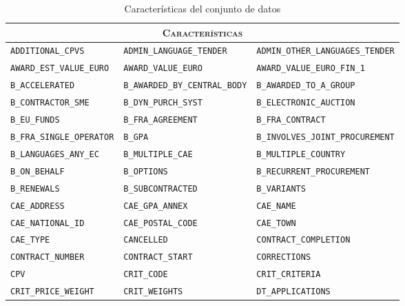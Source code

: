 \documentclass[a4paper,fleqn]{cas-sc}
\begin{document}
\begin{table}[t]
	\centering
	\scriptsize
	  \setlength{\tabcolsep}{7pt} 
	\renewcommand{\arraystretch}{1.3} %
	\caption{Características del conjunto de datos} \label{tab:variables} 	
	\begin{adjustbox}{max width=\textwidth}	
		\begin{tabular}{p{4cm}p{4.2cm}p{4.7cm}}		
			\hline
			\multicolumn{3}{c}{\textsc{\textbf{Características}}} \\ \hline
	
	\texttt{ADDITIONAL\_CPVS} & \texttt{ADMIN\_LANGUAGE\_TENDER} & \texttt{ADMIN\_OTHER\_LANGUAGES\_TENDER} \\
	\texttt{AWARD\_EST\_VALUE\_EURO} & \texttt{AWARD\_VALUE\_EURO} & \texttt{AWARD\_VALUE\_EURO\_FIN\_1} \\
	\texttt{B\_ACCELERATED} & \texttt{B\_AWARDED\_BY\_CENTRAL\_BODY} & \texttt{B\_AWARDED\_TO\_A\_GROUP} \\
	\texttt{B\_CONTRACTOR\_SME} & \texttt{B\_DYN\_PURCH\_SYST} & \texttt{B\_ELECTRONIC\_AUCTION} \\
	\texttt{B\_EU\_FUNDS} & \texttt{B\_FRA\_AGREEMENT} & \texttt{B\_FRA\_CONTRACT} \\
	\texttt{B\_FRA\_SINGLE\_OPERATOR} & \texttt{B\_GPA} & \texttt{B\_INVOLVES\_JOINT\_PROCUREMENT} \\
	\texttt{B\_LANGUAGES\_ANY\_EC} & \texttt{B\_MULTIPLE\_CAE} & \texttt{B\_MULTIPLE\_COUNTRY} \\
	\texttt{B\_ON\_BEHALF} & \texttt{B\_OPTIONS} & \texttt{B\_RECURRENT\_PROCUREMENT} \\
	\texttt{B\_RENEWALS} & \texttt{B\_SUBCONTRACTED} & \texttt{B\_VARIANTS} \\
	\texttt{CAE\_ADDRESS} & \texttt{CAE\_GPA\_ANNEX} & \texttt{CAE\_NAME} \\
	\texttt{CAE\_NATIONAL\_ID} & \texttt{CAE\_POSTAL\_CODE} & \texttt{CAE\_TOWN} \\
	\texttt{CAE\_TYPE} & \texttt{CANCELLED} & \texttt{CONTRACT\_COMPLETION} \\
	\texttt{CONTRACT\_NUMBER} & \texttt{CONTRACT\_START} & \texttt{CORRECTIONS} \\
	\texttt{CPV} & \texttt{CRIT\_CODE} & \texttt{CRIT\_CRITERIA} \\
	\texttt{CRIT\_PRICE\_WEIGHT} & \texttt{CRIT\_WEIGHTS} & \texttt{DT\_APPLICATIONS} \\

\end{tabular}
\end{adjustbox}
\end{table}
\end{document}
